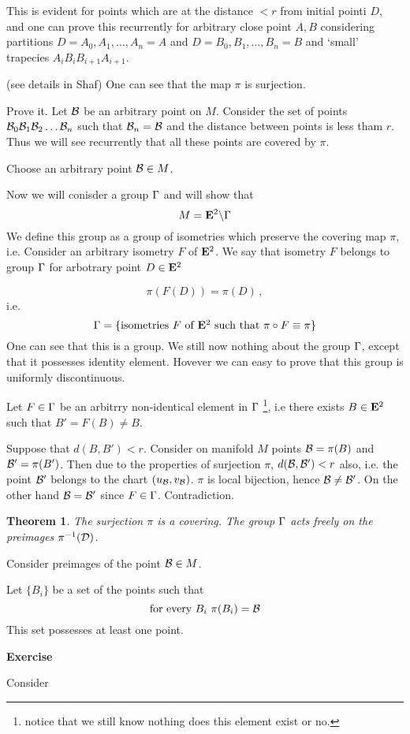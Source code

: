 \documentclass[12pt]{article}
\theoremstyle{theorem}
\newtheorem{thm}{Theorem}
\theoremstyle{lemma}
\numberwithin{equation}{section}
\begin{document}
This is evident for points which are at the distance
$<r$ from initial pointi $D$, and one can prove this recurrently
for arbitrary close point $A,B$ considering partitions
  $D=A_0,A_1,\dots,A_n=A$ and
  $D=B_0,B_1,\dots,B_n=B$  and `small' trapecies
 $A_iB_iB_{i+1}A_{i+1}$. 

(see details in {Shaf})
One can see that the map $\pi$ is surjection.               

Prove it. Let ${\cal B}$ be an arbitrary point on $M$.
Consider the set of points  ${\cal B}_0{\cal B}_1{\cal B}_2\dots{\cal B}_n$
such that ${\cal B}_n={\cal B}$ and the distance between points
is less tham $r$. Thus we will see recurrently that all 
these points  are covered by $\pi$.


  Choose an arbitrary point ${\cal B}\in M$.

Now we will conisder a group ${\Gamma}$ and will show
that 
        $$
   M={\bf E}^2\backslash {\Gamma}
        $$
We define this group as a group of isometries
which preserve the covering map $\pi$, i.e.
Consider an arbitrary isometry $F$ of ${\bf E}^2$.
We say that isometry $F$ belongs to group ${\Gamma}$
for arbotrary point $D\in {\bf E}^2$

     \begin{equation*}
	\pi\left(F\left(D\right)\right)=     
\pi\left(D\right)\,,
     \end{equation*}
i.e.     
\begin{equation*}
{\Gamma}=\{\hbox {isometries $F$ of ${\bf E}^2$  such that}\,\, 
\pi\circ F\equiv\pi\}
     \end{equation*}
One can see that this is a group.
We still now nothing about the group ${\Gamma}$,
except that it possesses identity element.
Hovever we can easy to prove that
this group is
uniformly discontinuous.

Let  $F\in {\Gamma}$ be an arbitrry non-identical element in ${\Gamma}$
\footnote{notice that we still know nothing
does this element exist or no.},
i.e  there exists $B\in {\bf E}^2$ such that $B'=F(B)\not=B$.

      Suppose that  $d(B,B')<r$. Consider on manifold
 $M$ points ${\cal B}=\pi(B)$ and ${\cal B}'=\pi(B')$.
 Then due to the properties of surjection
  $\pi$, $d({\cal B},{\cal B}')<r$ also, i.e. the point
  ${\cal B}'$ belongs to the chart $(u_{\cal B},v_{\cal B})$. 
$\pi$ is local bijection, hence ${\cal B}\not={\cal B}'$.
On the other hand ${\cal B}={\cal B}'$ since $F\in {\Gamma}$.
  Contradiction. 

\begin{thm}
The surjection $\pi$ is a covering. The group
${\Gamma}$ acts freely on the preimages $\pi^{-1}({\cal D})$.
\end{thm}

 

 Consider preimages of the  point ${\cal B}\in M$.




  Let $\{B_i\}$ be a set of the points such that
            $$
  \hbox{for every $B_i$}\,\,   \pi(B_i)={\cal B}
            $$
This set possesses at least one point. 

{\bf Exercise}

Consider 
\end{document}
